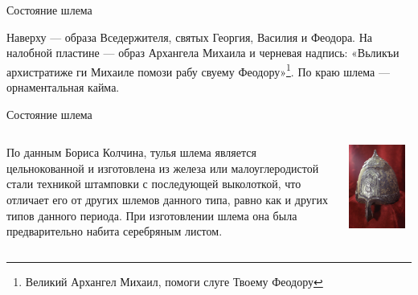 \begin{frame}{Состояние шлема}

	Наверху — образа Вседержителя, святых Георгия, Василия и Феодора. На налобной пластине — образ Архангела Михаила и черневая надпись: «Вьликъи архистратиже ги Михаиле помози рабу свуему Феодору»\footnote{Великий Архангел Михаил, помоги слуге Твоему Феодору}. По краю шлема — орнаментальная кайма.

\end{frame}
\begin{frame}{Состояние шлема}
	\begin{columns}
		\begin{column}{0.45\textwidth}

	По данным Бориса Колчина, тулья шлема является цельнокованной и изготовлена из железа или малоуглеродистой стали техникой штамповки с последующей выколоткой, что отличает его от других шлемов данного типа, равно как и других типов данного периода. При изготовлении шлема она была предварительно набита серебряным листом.

		\end{column}
		\begin{column}{0.45\textwidth}

			\includegraphics[width=0.9\textwidth]{shlem2.jpg}

		\end{column}
	\end{columns}
\end{frame}
